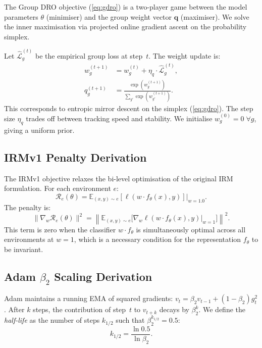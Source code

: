 \documentclass[10pt,twocolumn]{article}
\newcommand{\loss}{\mathcal{L}}
\newcommand{\EE}{\mathbb{E}}
\begin{document}
The Group DRO objective (\cref{eq:gdro}) is a two-player
game between the model parameters $\theta$ (minimiser) and the
group weight vector $\bm{q}$ (maximiser).  We solve the inner
maximisation via projected online gradient ascent on the
probability simplex.

Let $\hat{\loss}_g^{(t)}$ be the empirical group loss at
step~$t$.  The weight update is:
\begin{align}
  w_g^{(t+1)} &= w_g^{(t)} + \eta_q \cdot \hat{\loss}_g^{(t)},
  \label{eq:gdro_update} \\
  q_g^{(t+1)} &= \frac{\exp(w_g^{(t+1)})}
  {\sum_{g'}\exp(w_{g'}^{(t+1)})}.
  \label{eq:gdro_softmax}
\end{align}
This corresponds to entropic mirror descent on the simplex
(\cref{eq:gdro}).  The step size $\eta_q$ trades off between
tracking speed and stability.  We initialise
$w_g^{(0)} = 0 \;\forall g$, giving a uniform prior.

\subsection{IRMv1 Penalty Derivation}
\label{app:irm_derivation}

The IRMv1 objective relaxes the bi-level optimisation of the
original IRM formulation.  For each environment $e$:
\begin{equation}
  \mathcal{R}_e(\theta) = \EE_{(x,y)\sim e}
  [\ell(w \cdot f_\theta(x), y)] \Big|_{w=1.0}.
\end{equation}
The penalty is:
\begin{equation}
  \|\nabla_w \mathcal{R}_e(\theta)\|^2
  = \left\|
    \EE_{(x,y)\sim e}\bigl[
      \nabla_w \ell(w \cdot f_\theta(x), y)\big|_{w=1}
    \bigr]
  \right\|^2.
\end{equation}
This term is zero when the classifier $w \cdot f_\theta$ is
simultaneously optimal across all environments at $w=1$, which
is a necessary condition for the representation $f_\theta$ to
be invariant.

\subsection{Adam $\beta_2$ Scaling Derivation}
\label{app:beta2_derivation}

Adam maintains a running EMA of squared gradients:
$v_t = \beta_2 v_{t-1} + (1-\beta_2) g_t^2$.
After $k$ steps, the contribution of step~$t$ to $v_{t+k}$
decays by $\beta_2^k$.  We define the \emph{half-life} as the
number of steps $k_{1/2}$ such that $\beta_2^{k_{1/2}} = 0.5$:
\begin{equation}
  k_{1/2} = \frac{\ln 0.5}{\ln \beta_2}.
\end{equation}
\end{document}
